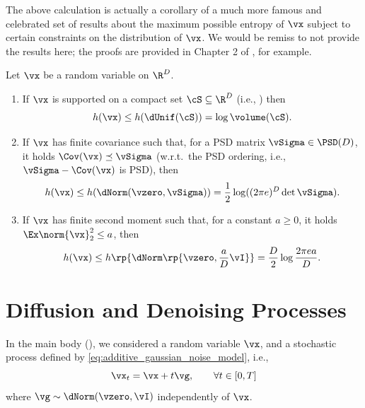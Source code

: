 \documentclass[../../book-main.tex]{subfiles}
\begin{document}
The above calculation is actually a corollary of a much more famous
and celebrated set of results about the maximum possible entropy of
\(\vx\) subject to certain constraints on the distribution of
\(\vx\). We would be remiss to not provide the results here; the
proofs are provided in Chapter 2 of \cite{poliyanski2024information},
for example.
\begin{theorem}\label{thm:max_entropy}
    Let \(\vx\) be a random variable on \(\R^{D}\).
    \begin{enumerate}
        \item If \(\vx\) is supported on a compact set \(\cS
            \subseteq \R^{D}\) (i.e.,
            ) then
            \begin{equation}
                h(\vx) \leq h(\dUnif(\cS)) = \log \volume(\cS).
            \end{equation}
        \item If \(\vx\) has finite covariance such that, for a PSD
            matrix \(\vSigma \in \PSD(D)\), it holds \(\Cov(\vx)
            \preceq \vSigma\) (w.r.t.~the PSD ordering, i.e.,
            \(\vSigma - \Cov(\vx)\) is PSD), then
            \begin{equation}
                h(\vx) \leq h(\dNorm(\vzero, \vSigma)) =
                \frac{1}{2}\log((2\pi e)^{D}\det\vSigma).
            \end{equation}
        \item If \(\vx\) has finite second moment such that, for a
            constant \(a \geq 0\), it holds \(\Ex\norm{\vx}_{2}^{2}
            \leq a\), then
            \begin{equation}
                h(\vx) \leq h\rp{\dNorm\rp{\vzero, \frac{a}{D}\vI}} =
                \frac{D}{2}\log\frac{2\pi e a}{D}.
            \end{equation}
    \end{enumerate}
\end{theorem}

\section{Diffusion and Denoising Processes}\label{sec:entropy_diffusion}

In the main body (), we considered a random
variable \(\vx\), and a stochastic process defined by
\eqref{eq:additive_gaussian_noise_model}, i.e.,
\begin{equation}\label{eq:app_additive_gaussian_noise_model}
    \vx_{t} = \vx + t\vg, \qquad  \forall t \in [0, T]
\end{equation}
where \(\vg \sim \dNorm(\vzero, \vI)\) independently of \(\vx\).
\end{document}
